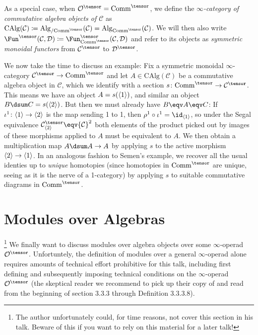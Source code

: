\documentclass[topology]{bsteffan-notes}
\newcommand{\cC}{{\mathcal{C}}}
\newcommand{\cD}{{\mathcal{D}}}
\newcommand{\cO}{{\mathcal{O}}}
\DeclarePairedDelimiter{\FSn}{\langle}{\rangle}
\newcommand{\Comm}{\mathrm{Comm}}
\newcommand{\Alg}{\mathrm{Alg}}
\newcommand{\CAlg}{\mathrm{CAlg}}
\begin{document}
As a special case, when $\cO^\tensor = \Comm^\tensor$, we define the \emph{$\infty$-category of commutative algebra objects of $\cC$} as $\CAlg(\cC) \coloneq \Alg_{/ \Comm^\tensor}(\cC) = \Alg_{\Comm^\tensor}(\cC)$.
We will then also write $\Fun^\tensor(\cC, \cD) \coloneq \Fun_{\Comm^\tensor}^\tensor(\cC, \cD)$ and refer to its objects as \emph{symmetric monoidal functors} from $\cC^\tensor$ to $\cD^\tensor$.

We now take the time to discuss an example: Fix a symmetric monoidal $\infty$-category $\cC^\tensor \to \Comm^\tensor$ and let $A \in \CAlg(\cC)$ be a commutative algebra object in $\cC$, which we identify with a section $s\colon \Comm^\tensor \to \cC^\tensor$.
This means we have an object $A = s(\FSn{1})$, and similar an object $B \dsum C = s(\FSn{2})$.
But then we must already have $B \eqv A \eqv C$: If $\iota^1\colon \FSn{1} \to \FSn{2}$ is the map sending 1 to 1, then $\rho^1 \circ \iota^1 = \id_{\FSn{1}}$, so under the Segal equivalence $\cC^\tensor_{\FSn{2}} \eqv \cC^2$ both elements of the product picked out by images of these morphisms applied to $A$ must be equivalent to $A$.
We then obtain a multiplication map $A \dsum A \to A$ by applying $s$ to the active morphism $\FSn{2} \to \FSn{1}$.
In an analogous fashion to Semen's example, we recover all the usual identies up to \emph{unique} homotopies (since homotopies in $\Comm^\tensor$ are unique, seeing as it is the nerve of a 1-category) by applying $s$ to suitable commutative diagrams in $\Comm^\tensor$.

\section[Modules]{Modules over Algebras}\footnote{The author unfortunately could, for time reasons, not cover this section in his talk. Beware of this if you want to rely on this material for a later talk!}
We finally want to discuss modules over algebra objects over some $\infty$-operad $\cO^\tensor$.
Unfortuntely, the definition of modules over a general $\infty$-operad alone requires amounts of technical effort prohibitive for this talk, including first defining and subsequently imposing technical conditions on the $\infty$-operad $\cO^\tensor$ (the skeptical reader we recommend to pick up their copy of \cite{lurie_higher_2017} and read from the beginning of section 3.3.3 through Definition 3.3.3.8).
\end{document}
